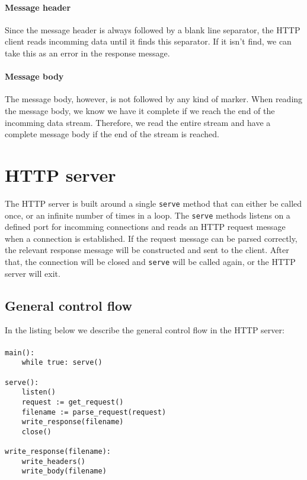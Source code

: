\documentclass[11pt]{article}
\begin{document}
\paragraph{Message header}

Since the message header is always followed by a blank line separator, the
HTTP client reads incomming data until it finds this separator. If it isn't
find, we can take this as an error in the response message.

\paragraph{Message body}

The message body, however, is not followed by any kind of marker. When reading
the message body, we know we have it complete if we reach the end of the
incomming data stream. Therefore, we read the entire stream and have a
complete message body if the end of the stream is reached.


\section{HTTP server}

The HTTP server is built around a single \lstinline|serve| method that can either
be called once, or an infinite number of times in a loop. The \lstinline|serve|
methods listens on a defined port for incomming connections and reads an HTTP
request message when a connection is established. If the request message can
be parsed correctly, the relevant response message will be constructed and
sent to the client. After that, the connection will be closed and \lstinline|serve|
will be called again, or the HTTP server will exit.


\subsection{General control flow}

In the listing below we describe the general control flow in the HTTP server:

\paragraph{}

\begin{lstlisting}[title=HTTP client control flow]
main():
    while true: serve()

serve():
    listen()
    request := get_request()
    filename := parse_request(request)
    write_response(filename)
    close()

write_response(filename):
    write_headers()
    write_body(filename)
\end{lstlisting}
\end{document}
